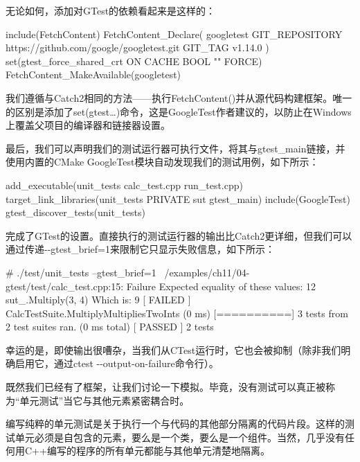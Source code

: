 无论如何，添加对GTest的依赖看起来是这样的：


\begin{cmake}
include(FetchContent)
FetchContent_Declare(
    googletest
    GIT_REPOSITORY https://github.com/google/googletest.git
    GIT_TAG v1.14.0
)
set(gtest_force_shared_crt ON CACHE BOOL "" FORCE)
FetchContent_MakeAvailable(googletest)
\end{cmake}

我们遵循与Catch2相同的方法——执行FetchContent()并从源代码构建框架。唯一的区别是添加了set(gtest…)命令，这是GoogleTest作者建议的，以防止在Windows上覆盖父项目的编译器和链接器设置。

最后，我们可以声明我们的测试运行器可执行文件，将其与gtest\_main链接，并使用内置的CMake GoogleTest模块自动发现我们的测试用例，如下所示：


\begin{cmake}
add_executable(unit_tests
               calc_test.cpp
               run_test.cpp)
target_link_libraries(unit_tests PRIVATE sut gtest_main)
include(GoogleTest)
gtest_discover_tests(unit_tests)
\end{cmake}

完成了GTest的设置。直接执行的测试运行器的输出比Catch2更详细，但我们可以通过传递-{}-gtest\_brief=1来限制它只显示失败信息，如下所示：

\begin{shell}
# ./test/unit_tests --gtest_brief=1
~/examples/ch11/04-gtest/test/calc_test.cpp:15: Failure
Expected equality of these values:
  12
  sut_.Multiply(3, 4)
    Which is: 9
[ FAILED ] CalcTestSuite.MultiplyMultipliesTwoInts (0 ms)
[==========] 3 tests from 2 test suites ran. (0 ms total)
[ PASSED ] 2 tests
\end{shell}

幸运的是，即使输出很嘈杂，当我们从CTest运行时，它也会被抑制（除非我们明确启用它，通过ctest -{}-output-on-failure命令行）。

既然我们已经有了框架，让我们讨论一下模拟。毕竟，没有测试可以真正被称为“单元测试”当它与其他元素紧密耦合时。


编写纯粹的单元测试是关于执行一个与代码的其他部分隔离的代码片段。这样的测试单元必须是自包含的元素，要么是一个类，要么是一个组件。当然，几乎没有任何用C++编写的程序的所有单元都能与其他单元清楚地隔离。

